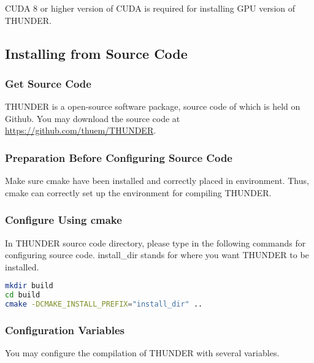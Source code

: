 \documentclass{article}
\begin{document}
            CUDA 8 or higher version of CUDA is required for installing GPU version of THUNDER.
        
        \subsection{Installing from Source Code}
        
            \subsubsection{Get Source Code}
            
            THUNDER is a open-source software package, source code of which is held on Github. You may download the source code at \url{https://github.com/thuem/THUNDER}.
        
            \subsubsection{Preparation Before Configuring Source Code}
            
                Make sure \textsf{cmake} have been installed and correctly placed in environment. Thus, \textsf{cmake} can correctly set up the environment for compiling THUNDER.
        
            \subsubsection{Configure Using \textsf{cmake}}
            
                In THUNDER source code directory, please type in the following commands for configuring source code. \textsf{install\_dir} stands for where you want THUNDER to be installed.
            
                \begin{lstlisting}[language={sh}]
mkdir build
cd build
cmake -DCMAKE_INSTALL_PREFIX="install_dir" ..
                \end{lstlisting}
                
            \subsubsection{Configuration Variables}
            
                You may configure the compilation of THUNDER with several variables.
                
\end{document}
